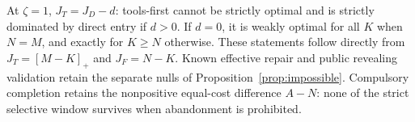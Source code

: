 At $\zeta=1$, $J_T=J_D-d$: tools-first cannot be strictly optimal and is strictly dominated by direct entry if $d>0$. If $d=0$, it is weakly optimal for all $K$ when $N=M$, and exactly for $K\geq N$ otherwise. These statements follow directly from $J_T=[M-K]_+$ and $J_F=N-K$. Known effective repair and public revealing validation retain the separate nulls of Proposition~\ref{prop:impossible}. Compulsory completion retains the nonpositive equal-cost difference $A-N$: none of the strict selective window survives when abandonment is prohibited.
